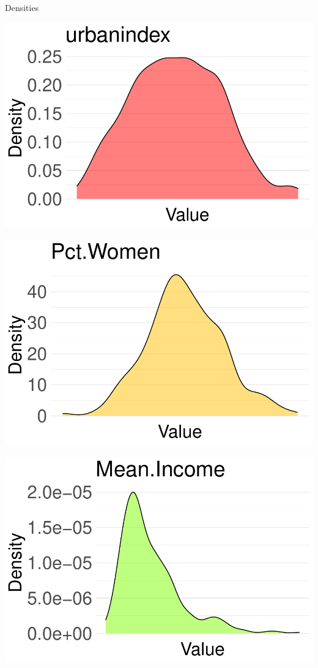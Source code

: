 \documentclass{beamer}
\begin{document}
\begin{frame}{Densities}
    \centering
    \begin{minipage}{0.3\textwidth}
        \centering
        \includegraphics[width=\textwidth]{plots/urbanindex_density_plot.pdf}
    \end{minipage}
    \hfill
    \begin{minipage}{0.3\textwidth}
        \centering
        \includegraphics[width=\textwidth]{plots/Pct.Women_density_plot.pdf}
    \end{minipage}
    \hfill
    \begin{minipage}{0.3\textwidth}
        \centering
        \includegraphics[width=\textwidth]{plots/Mean.Income_density_plot.pdf}
    \end{minipage}
    

\end{frame}
\end{document}
